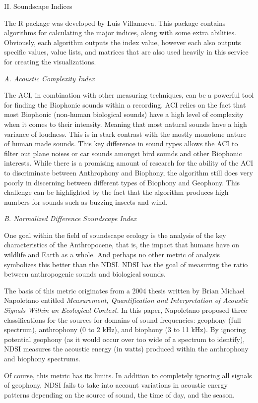 \begin{center}
II. Soundscape Indices
\end{center}
\begin{flushleft}
\setlength{\parindent}{0.125in}
The  R package was developed by Luis Villanueva. This package contains algorithms for calculating the major indices, along with some extra abilities. Obviously, each algorithm outputs the index value, however each also outputs specific values, value lists, and matrices that are also used heavily in this service for creating the visualizations.\par

\noindent\textit{A. Acoustic Complexity Index}\par
The ACI, in combination with other measuring techniques, can be a powerful tool for finding the Biophonic sounds within a recording. ACI relies on the fact that most Biophonic (non-human biological sounds) have a high level of complexity when it comes to their intensity. Meaning that most natural sounds have a high variance of loudness. This is in stark contrast with the mostly monotone nature of human made sounds. This key difference in sound types allows the ACI to filter out plane noises or car sounds amongst bird sounds and other Biophonic interests. While there is a promising amount of research for the ability of the ACI to discriminate between Anthrophony and Biophony, the algorithm still does very poorly in discerning between different types of Biophony and Geophony. This challenge can be highlighted by the fact that the algorithm produces high numbers for sounds such as buzzing insects and wind.\par

\noindent\textit{B. Normalized Difference Soundscape Index}\par
One goal within the field of soundscape ecology is the analysis of the key characteristics of the Anthropocene, that is, the impact that humans have on wildlife and Earth as a whole. And perhaps no other metric of analysis symbolizes this better than the NDSI. NDSI has the goal of measuring the ratio between anthropogenic sounds and biological sounds.\par
The basis of this metric originates from a 2004 thesis written by Brian Michael Napoletano entitled \textit{Measurement, Quantification and Interpretation of Acoustic Signals Within an Ecological Context.} In this paper, Napoletano proposed three classifications for the sources for domains of sound frequencies: geophony (full spectrum), anthrophony (0 to 2 kHz), and biophony (3 to 11 kHz).\cite{napoletano} By ignoring potential geophony (as it would occur over too wide of a spectrum to identify), NDSI measures the acoustic energy (in watts) produced within the anthrophony and biophony spectrums.\par
Of course, this metric has its limits. In addition to completely ignoring all signals of geophony, NDSI fails to take into account variations in acoustic energy patterns depending on the source of sound, the time of day, and the season.\par


\end{flushleft}
